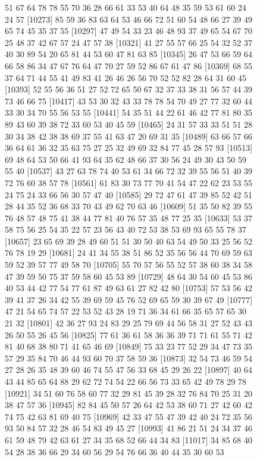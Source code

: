 \documentclass{article}
\begin{document}
\begin{figure}[H]
\begin{Schunk}
\begin{Soutput}
[10249] 51 67 64 78 78 55 70 36 28 66 61 33 53 40 64 48 35 59 53 61 60 24 24 57
[10273] 85 59 36 83 63 64 53 46 66 72 51 60 54 48 66 27 39 49 65 74 45 35 37 55
[10297] 47 49 54 33 23 46 48 93 37 49 65 54 67 70 25 48 37 42 67 57 24 47 57 38
[10321] 41 27 55 57 66 25 54 32 52 37 40 30 89 54 20 65 81 44 53 60 47 81 63 85
[10345] 26 47 53 66 59 64 66 58 86 34 47 67 76 64 47 70 27 59 52 86 67 61 47 86
[10369] 68 55 37 64 71 44 55 41 49 83 41 26 46 26 56 70 52 52 82 28 64 31 60 45
[10393] 52 55 56 36 51 27 52 72 65 50 67 32 37 33 38 31 56 57 44 39 73 46 66 75
[10417] 43 53 30 32 43 33 78 78 54 70 49 27 77 32 60 44 33 30 34 70 55 56 53 55
[10441] 54 35 51 44 22 61 46 42 77 81 80 35 89 43 60 39 38 72 33 60 53 40 45 59
[10465] 24 31 57 33 33 51 51 28 30 34 38 42 38 38 69 37 55 41 63 47 20 69 31 35
[10489] 63 66 57 66 36 64 61 36 32 35 63 75 27 25 32 49 69 32 84 77 45 28 57 93
[10513] 69 48 64 53 50 66 41 93 64 35 62 48 66 37 30 56 24 49 30 43 50 59 55 40
[10537] 43 27 63 78 74 40 53 61 34 66 72 32 39 55 56 51 40 39 72 76 60 38 57 78
[10561] 61 83 30 73 77 70 41 54 47 22 62 23 53 55 24 75 24 33 66 56 30 57 47 40
[10585] 29 72 47 61 47 39 85 52 42 51 28 44 35 52 36 68 33 70 43 49 62 70 63 46
[10609] 51 35 50 82 39 55 76 48 57 48 75 41 38 44 77 81 40 76 57 35 48 77 25 35
[10633] 53 37 58 75 56 25 54 35 22 57 23 56 43 40 72 53 38 53 69 93 65 55 78 37
[10657] 23 65 69 39 28 49 60 51 51 30 50 40 63 54 49 50 33 25 56 52 76 78 19 29
[10681] 24 41 34 55 38 51 86 52 35 56 56 44 70 69 59 63 59 52 39 57 77 49 58 70
[10705] 55 70 57 56 55 52 57 38 60 38 34 58 47 39 59 50 75 37 59 58 60 45 53 89
[10729] 48 64 30 54 60 45 53 86 40 53 44 42 77 54 77 61 87 49 63 61 27 82 42 80
[10753] 57 53 56 42 39 41 37 26 34 42 55 39 69 59 45 76 52 69 65 59 30 39 67 49
[10777] 47 21 54 65 74 57 22 53 52 43 28 19 71 36 34 61 66 35 65 57 65 30 21 32
[10801] 42 36 27 93 24 83 29 25 79 69 44 56 58 31 27 52 43 43 26 50 55 26 45 56
[10825] 77 61 36 61 58 36 36 39 71 71 61 55 71 42 81 40 68 38 80 71 41 65 46 69
[10849] 75 33 23 77 52 29 34 47 73 35 57 29 35 84 70 46 44 93 60 70 37 58 59 36
[10873] 32 54 73 46 59 54 27 28 26 35 48 39 60 46 74 55 47 56 33 68 45 29 26 22
[10897] 40 64 43 44 85 65 64 88 29 62 72 74 54 22 66 56 73 33 65 42 49 78 29 78
[10921] 34 51 60 76 58 60 77 32 29 81 45 39 28 32 76 84 70 25 31 20 38 47 57 36
[10945] 82 84 45 50 57 26 64 42 53 38 60 71 27 42 60 42 74 75 42 63 81 69 40 75
[10969] 42 33 47 55 47 39 42 40 24 72 35 56 93 50 84 57 32 28 46 54 83 49 45 27
[10993] 41 86 21 51 24 34 37 46 61 59 48 79 42 63 61 27 34 35 68 52 66 44 34 83
[11017] 34 85 68 40 54 28 38 36 66 29 34 60 56 29 54 76 66 36 40 44 35 30 60 53

\end{Soutput}
\end{Schunk}
\end{figure}
\end{document}
